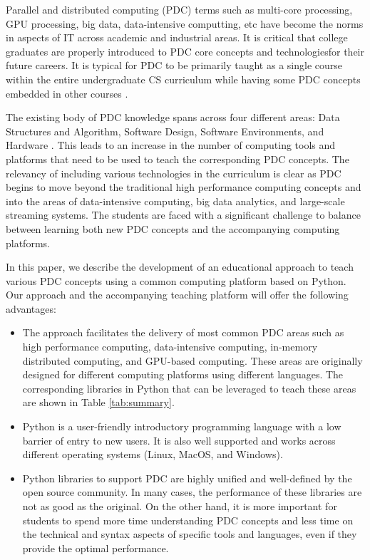 Parallel and distributed computing (PDC) terms such as multi-core processing,
GPU processing, big data, data-intensive computting, etc have become the norms
 in aspects of IT across academic and industrial areas. It is critical that
  college graduates are properly introduced to PDC core concepts and
technologiesfor their future careers. It is typical for PDC to be primarily
taught as a single course within the entire undergraduate CS curriculum while
having some PDC concepts embedded in other courses
\cite{wolffe2009teaching,butler1988introducing}.

The existing body of PDC knowledge spans across four different areas: Data
Structures and Algorithm, Software Design, Software Environments, and Hardware
\cite{brown2010strategies}. This leads to an increase in the number of
computing tools and platforms that need to be used to teach the corresponding
PDC concepts. The relevancy of including various technologies in the curriculum
is clear as PDC begins to move beyond the traditional high performance computing
concepts and into the areas of data-intensive computing, big data analytics, and
 large-scale streaming systems. The students are faced with a significant
 challenge to balance between learning both new PDC concepts and the
accompanying computing platforms.

In this paper, we describe the development of an educational approach to teach
various PDC concepts using a common computing platform based on Python. Our
approach and the accompanying teaching platform will offer the following
advantages:

\begin{itemize}
  \item The approach facilitates the delivery of most common PDC areas such as
   high performance computing, data-intensive computing, in-memory distributed
    computing, and GPU-based computing. These areas are originally designed for different computing platforms using different languages. The corresponding
    libraries in Python that can be leveraged to teach these areas are shown in
    Table \ref{tab:summary}.
  \item Python is a user-friendly introductory programming language with a low
  barrier of entry to new users. It is also well supported and works across
  different operating systems (Linux, MacOS, and Windows).
  \item Python libraries to support PDC are highly unified and well-defined by
  the open source community. In many cases, the performance of these libraries
  are not as good as the original. On the other hand, it is more important for
  students to spend more time understanding PDC concepts and less time on the
  technical and syntax aspects of specific tools and languages, even if they provide the optimal performance.
\end{itemize}

